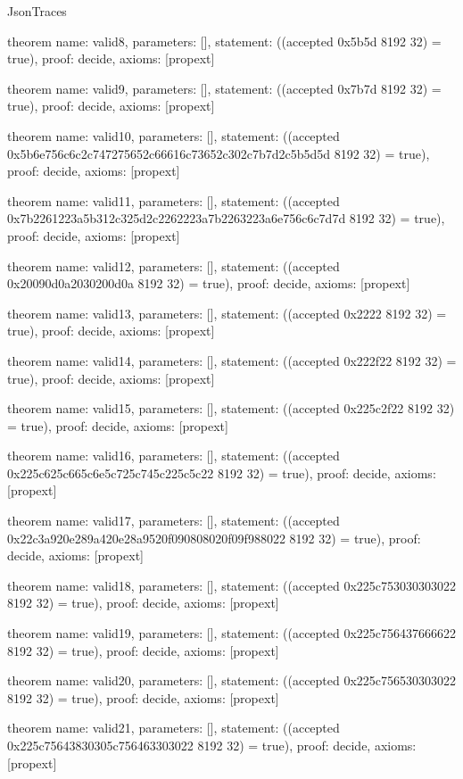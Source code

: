 \begin{lexlean}{JsonTraces}
\begin{semanticmodule}
theorem{
  name: valid8,
  parameters: [],
  statement: ((accepted 0x5b5d 8192 32) = true),
  proof: decide{},
  axioms: [propext]
}

theorem{
  name: valid9,
  parameters: [],
  statement: ((accepted 0x7b7d 8192 32) = true),
  proof: decide{},
  axioms: [propext]
}

theorem{
  name: valid10,
  parameters: [],
  statement: ((accepted 0x5b6e756c6c2c747275652c66616c73652c302c7b7d2c5b5d5d 8192 32) = true),
  proof: decide{},
  axioms: [propext]
}

theorem{
  name: valid11,
  parameters: [],
  statement: ((accepted 0x7b2261223a5b312c325d2c2262223a7b2263223a6e756c6c7d7d 8192 32) = true),
  proof: decide{},
  axioms: [propext]
}

theorem{
  name: valid12,
  parameters: [],
  statement: ((accepted 0x20090d0a2030200d0a 8192 32) = true),
  proof: decide{},
  axioms: [propext]
}

theorem{
  name: valid13,
  parameters: [],
  statement: ((accepted 0x2222 8192 32) = true),
  proof: decide{},
  axioms: [propext]
}

theorem{
  name: valid14,
  parameters: [],
  statement: ((accepted 0x222f22 8192 32) = true),
  proof: decide{},
  axioms: [propext]
}

theorem{
  name: valid15,
  parameters: [],
  statement: ((accepted 0x225c2f22 8192 32) = true),
  proof: decide{},
  axioms: [propext]
}

theorem{
  name: valid16,
  parameters: [],
  statement: ((accepted 0x225c625c665c6e5c725c745c225c5c22 8192 32) = true),
  proof: decide{},
  axioms: [propext]
}

theorem{
  name: valid17,
  parameters: [],
  statement: ((accepted 0x22c3a920e289a420e28a9520f090808020f09f988022 8192 32) = true),
  proof: decide{},
  axioms: [propext]
}

theorem{
  name: valid18,
  parameters: [],
  statement: ((accepted 0x225c753030303022 8192 32) = true),
  proof: decide{},
  axioms: [propext]
}

theorem{
  name: valid19,
  parameters: [],
  statement: ((accepted 0x225c756437666622 8192 32) = true),
  proof: decide{},
  axioms: [propext]
}

theorem{
  name: valid20,
  parameters: [],
  statement: ((accepted 0x225c756530303022 8192 32) = true),
  proof: decide{},
  axioms: [propext]
}

theorem{
  name: valid21,
  parameters: [],
  statement: ((accepted 0x225c75643830305c756463303022 8192 32) = true),
  proof: decide{},
  axioms: [propext]
}


\end{semanticmodule}
\end{lexlean}
